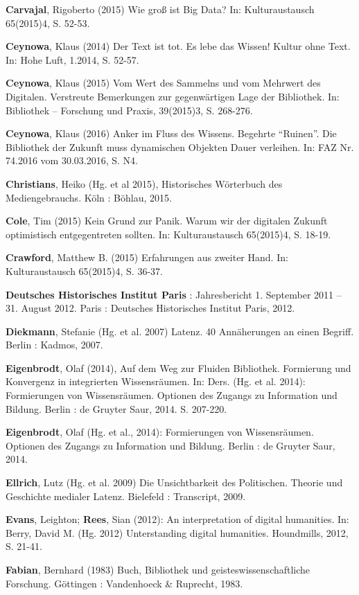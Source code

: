 \documentclass[a4paper,
fontsize=11pt,
oneside,
numbers=noperiodatend,
parskip=half-,
bibliography=totoc,
final
]{scrartcl}
\begin{document}
\textbf{Carvajal}, Rigoberto (2015) Wie groß ist Big Data? In:
Kulturaustausch 65(2015)4, S. 52-53.

\textbf{Ceynowa}, Klaus (2014) Der Text ist tot. Es lebe das Wissen!
Kultur ohne Text. In: Hohe Luft, 1.2014, S. 52-57.

\textbf{Ceynowa}, Klaus (2015) Vom Wert des Sammelns und vom Mehrwert
des Digitalen. Verstreute Bemerkungen zur gegenwärtigen Lage der
Bibliothek. In: Bibliothek -- Forschung und Praxis, 39(2015)3, S.
268-276.

\textbf{Ceynowa}, Klaus (2016) Anker im Fluss des Wissens. Begehrte
\enquote{Ruinen}. Die Bibliothek der Zukunft muss dynamischen Objekten
Dauer verleihen. In: FAZ Nr. 74.2016 vom 30.03.2016, S. N4.

\textbf{Christians}, Heiko (Hg. et al 2015), Historisches Wörterbuch des
Mediengebrauchs. Köln : Böhlau, 2015.

\textbf{Cole}, Tim (2015) Kein Grund zur Panik. Warum wir der digitalen
Zukunft optimistisch entgegentreten sollten. In: Kulturaustausch
65(2015)4, S. 18-19.

\textbf{Crawford}, Matthew B. (2015) Erfahrungen aus zweiter Hand. In:
Kulturaustausch 65(2015)4, S. 36-37.

\textbf{Deutsches Historisches Institut Paris} : Jahresbericht 1.
September 2011 -- 31. August 2012. Paris : Deutsches Historisches
Institut Paris, 2012.

\textbf{Diekmann}, Stefanie (Hg. et al. 2007) Latenz. 40 Annäherungen an
einen Begriff. Berlin : Kadmos, 2007.

\textbf{Eigenbrodt}, Olaf (2014), Auf dem Weg zur Fluiden Bibliothek.
Formierung und Konvergenz in integrierten Wissensräumen. In: Ders. (Hg.
et al. 2014): Formierungen von Wissensräumen. Optionen des Zugangs zu
Information und Bildung. Berlin : de Gruyter Saur, 2014. S. 207-220.

\textbf{Eigenbrodt}, Olaf (Hg. et al., 2014): Formierungen von
Wissensräumen. Optionen des Zugangs zu Information und Bildung. Berlin :
de Gruyter Saur, 2014.

\textbf{Ellrich}, Lutz (Hg. et al. 2009) Die Unsichtbarkeit des
Politischen. Theorie und Geschichte medialer Latenz. Bielefeld :
Transcript, 2009.

\textbf{Evans}, Leighton; \textbf{Rees}, Sian (2012): An interpretation
of digital humanities. In: Berry, David M. (Hg. 2012) Unterstanding
digital humanities. Houndmills, 2012, S. 21-41.

\textbf{Fabian}, Bernhard (1983) Buch, Bibliothek und
geisteswissenschaftliche Forschung. Göttingen : Vandenhoeck \& Ruprecht,
1983.
\end{document}
